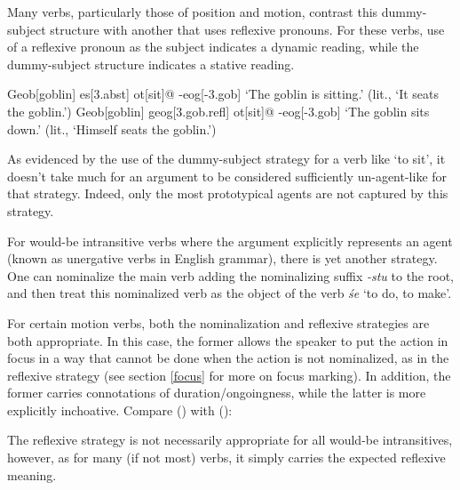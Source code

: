 \documentclass[a4paper,11pt,oneside,openany]{memoir}
\begin{document}

Many verbs, particularly those of position and motion, contrast this dummy-subject structure with another that uses reflexive pronouns. For these verbs, use of a reflexive pronoun as the subject indicates a dynamic reading, while the dummy-subject structure indicates a stative reading.

\pex
\a
\begingl
Geob[goblin]
es[\sc 3.abst]
ot[sit]@
-eog[\sc -3.gob]
\glft `The goblin is sitting.' (lit., `It seats the goblin.')
\endgl
\a
\begingl
Geob[goblin]
geog[\sc 3.gob.refl]
ot[sit]@
-eog[\sc -3.gob]
\glft `The goblin sits down.' (lit., `Himself seats the goblin.')
\endgl
\xe

As evidenced by the use of the dummy-subject strategy for a verb like `to sit', it doesn't take much for an argument to be considered sufficiently un-agent-like for that strategy. Indeed, only the most prototypical agents are not captured by this strategy.

For would-be intransitive verbs where the argument explicitly represents an agent (known as unergative verbs in English grammar), there is yet another strategy. One can nominalize the main verb adding the nominalizing suffix \textit{-stu} to the root, and then treat this nominalized verb as the object of the verb \textit{\'se} `to do, to make'.


For certain motion verbs, both the nominalization and reflexive strategies are both appropriate. In this case, the former allows the speaker to put the action in focus in a way that cannot be done when the action is not nominalized, as in the reflexive strategy (see section \ref{focus} for more on focus marking). In addition, the former carries connotations of duration/ongoingness, while the latter is more explicitly inchoative. Compare (\lastx) with (\nextx):


The reflexive strategy is not necessarily appropriate for all would-be intransitives, however, as for many (if not most) verbs, it simply carries the expected reflexive meaning.
\end{document}
